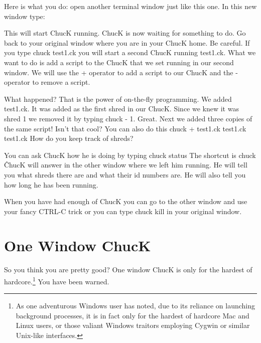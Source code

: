 Here is what you do: open another terminal window just like this one. In this new window type:

This will start ChucK running. ChucK is now waiting for something to do. Go back to your original window where you are in your ChucK home. Be careful. If you type chuck test1.ck you will start a second ChucK running test1.ck. What we want to do is add a script to the ChucK that we set running in our second window. We will use the + operator to add a script to our ChucK and the - operator to remove a script. 


What happened? That is the power of on-the-fly programming. We added test1.ck. It was added as the first shred in our ChucK. Since we knew it was shred 1 we removed it by typing chuck - 1. Great. Next we added three copies of the same script! Isn't that cool? You can also do this chuck + test1.ck test1.ck test1.ck How do you keep track of shreds? 

You can ask ChucK how he is doing by typing chuck \doubledash status The shortcut is chuck \^ ChucK will answer in the other window where we left him running. He will tell you what shreds there are and what their id numbers are. He will also tell you how long he has been running. 

When you have had enough of ChucK you can go to the other window and use your fancy CTRL-C trick or you can type chuck \doubledash kill in your original window.   


\section*{One Window ChucK}

So you think you are pretty good? One window ChucK is only for the hardest of hardcore.\footnote{As one adventurous Windows user has noted, due to its reliance on launching background processes, it is in fact only for the hardest of hardcore Mac and Linux users, or those valiant Windows traitors employing Cygwin or similar Unix-like interfaces.} You have been warned. 

